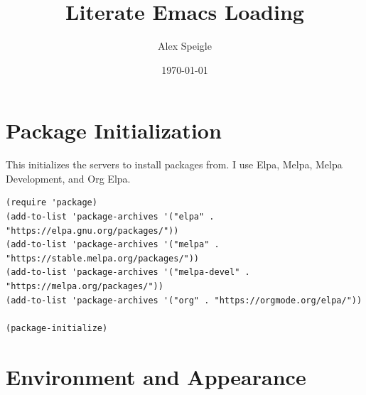 \documentclass[11pt]{article}
\author{Alex Speigle}
\date{\today}
\title{Literate Emacs Loading}
\begin{document}
\maketitle
\tableofcontents

\section{Package Initialization}
\label{sec:org1b5e055}
This initializes the servers to install packages from. I use Elpa, Melpa, Melpa Development, and Org Elpa. 

\begin{verbatim}
(require 'package)
(add-to-list 'package-archives '("elpa" . "https://elpa.gnu.org/packages/"))
(add-to-list 'package-archives '("melpa" . "https://stable.melpa.org/packages/"))
(add-to-list 'package-archives '("melpa-devel" . "https://melpa.org/packages/"))
(add-to-list 'package-archives '("org" . "https://orgmode.org/elpa/"))

(package-initialize)
\end{verbatim}
\section{Environment and Appearance}
\label{sec:org9b30526}
\end{document}

